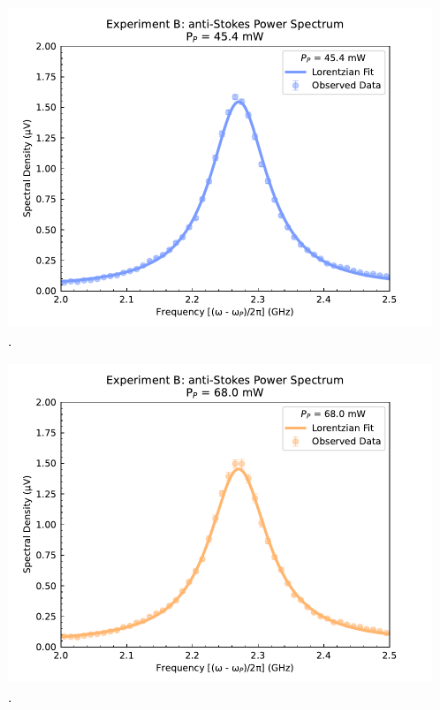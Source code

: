 \begin{figure}[t!]
  \centering
  \includegraphics[width=\textwidth]{figs/3-Cooling/P-P anti-Stokes Fit - 110mW.pdf}
  \caption{.}
  \label{fig:Cooling:P-P anti-Stokes Fit - 110mW}
\end{figure}

\begin{figure}[t!]
  \centering
  \includegraphics[width=\textwidth]{figs/3-Cooling/P-P anti-Stokes Fit - 165mW.pdf}
  \caption{.}
  \label{fig:Cooling:P-P anti-Stokes Fit - 165mW}
\end{figure}

